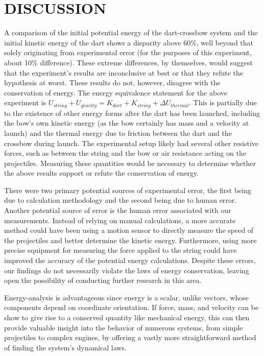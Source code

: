 \documentclass[twocolumn, 10pt]{article}
\begin{document}
\section{DISCUSSION}
A comparison of the initial potential energy of the dart-crossbow system and the initial kinetic energy of the dart shows a disparity above 60\%, well beyond that solely originating from experimental error (for the purposes of this experiment, about 10\% difference). These extreme differences, by themselves, would suggest that the experiment’s results are inconclusive at best or that they refute the hypothesis at worst. These results do not, however, disagree with the conservation of energy. The energy equivalence statement for the above experiment is $U_{string} + U_{gravity} = K_{dart} + K_{string} + \Delta U_{thermal}$. This is partially due to the existence of other energy forms after the dart has been launched, including the bow’s own kinetic energy (as the bow certainly has mass and a velocity at launch) and the thermal energy due to friction between the dart and the crossbow during launch. The experimental setup likely had several other resistive forces, such as between the string and the bow or air resistance acting on the projectiles. Measuring these quantities would be necessary to determine whether the above results support or refute the conservation of energy.

\hspace{\parindent}There were two primary potential sources of experimental error, the first being due to calculation methodology and the second being due to human error. Another potential source of error is the human error associated with our measurements. Instead of relying on manual calculations, a more accurate method could have been using a motion sensor to directly measure the speed of the projectiles and better determine the kinetic energy. Furthermore, using more precise equipment for measuring the force applied to the string could have improved the accuracy of the potential energy calculations.
Despite these errors, our findings do not necessarily violate the laws of energy conservation, leaving open the possibility of conducting further research in this area.

Energy-analysis is advantageous since energy is a scalar, unlike vectors, whose components depend on coordinate orientation. If force, mass, and velocity can be show to give rise to a conserved quantity like mechanical energy, this can then provide valuable insight into the behavior of numerous systems, from simple projectiles to complex engines, by offering a vastly more straightforward method of finding the system's dynamical laws.
\vspace{-12pt}
\end{document}
